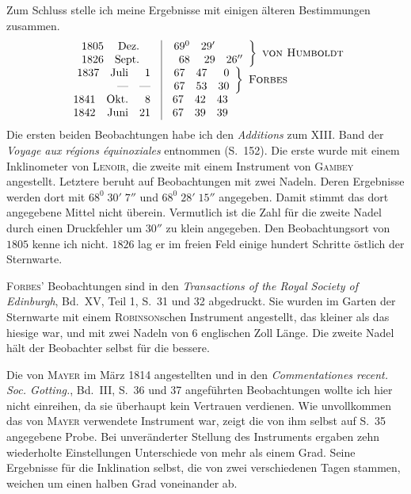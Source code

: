 Zum Schluss stelle ich meine Ergebnisse mit einigen älteren Bestimmungen zusammen.
\[
\begin{array}{r|l}
\begin{array}{rrr}1805&\text{Dez.}&\\1826&\text{Sept.}&\end{array}&
\left.\begin{array}{rrr}69^0&29'&\\68&29&26''\end{array}\right\}\ \text{\textsc{von Humboldt}}\\
\begin{array}{rrr}1837&\text{Juli}&1\\&\text{—}&\text{—}\end{array}&
\left.\begin{array}{rrr}67&47&0\\67&53&30\end{array}\right\}\ \text{\textsc{Forbes}}\\
\begin{array}{rrr}1841&\text{Okt.}&8\\1842&\text{Juni}&21\end{array}&
\begin{array}{rrr}67&42&43\\67&39&39\end{array}
\end{array}
\]
Die ersten beiden Beobachtungen habe ich den \textit{Additions} zum XIII. Band der \textit{Voyage aux régions équinoxiales} entnommen (S.\ 152). Die erste wurde mit einem Inklinometer von \textsc{Lenoir}, die zweite mit einem Instrument von \textsc{Gambey} angestellt. Letztere beruht auf Beobachtungen mit zwei Nadeln. Deren Ergebnisse werden dort mit $68^0\;30'\;7''$ und $68^0\;28'\;15''$ angegeben. Damit stimmt das dort angegebene Mittel nicht überein. Vermutlich ist die Zahl für die zweite Nadel durch einen Druckfehler um $30''$ zu klein angegeben. Den Beobachtungsort von $1805$ kenne ich nicht. $1826$ lag er im freien Feld einige hundert Schritte östlich der Sternwarte.

\textsc{Forbes}' Beobachtungen sind in den \textit{Transactions of the Royal Society of Edinburgh}, Bd.\ XV, Teil 1, S.\ 31 und 32 abgedruckt. Sie wurden im Garten der Sternwarte mit einem \textsc{Robinson}schen Instrument angestellt, das kleiner als das hiesige war, und mit zwei Nadeln von $6$ englischen Zoll Länge. Die zweite Nadel hält der Beobachter selbst für die bessere.

Die von \textsc{Mayer} im März 1814 angestellten und in den \textit{Commentationes recent. Soc. Gotting.}, Bd.\ III, S.\ 36 und 37 angeführten Beobachtungen wollte ich hier nicht einreihen, da sie überhaupt kein Vertrauen verdienen. Wie unvollkommen das von \textsc{Mayer} verwendete Instrument war, zeigt die von ihm selbst auf S.\ 35 angegebene Probe. Bei unveränderter Stellung des Instruments ergaben zehn wiederholte Einstellungen Unterschiede von mehr als einem Grad. Seine Ergebnisse für die Inklination selbst, die von zwei verschiedenen Tagen stammen, weichen um einen halben Grad voneinander ab.

